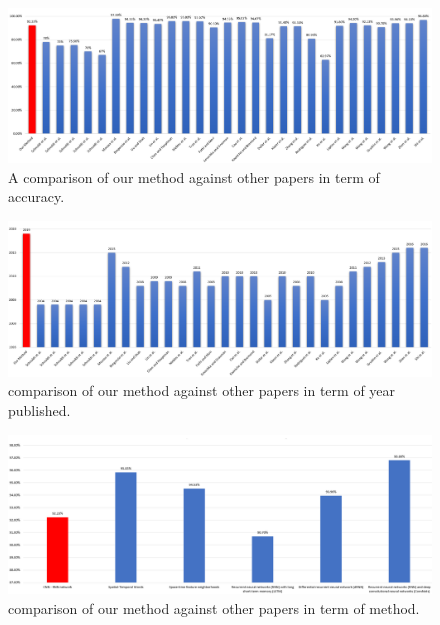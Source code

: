 \begin{figure}[ht]
\centering

\includegraphics[angle=90,origin=c,width=0.6\columnwidth]{Chapters/photos/comparisonintermofaccuracy.PNG}

\decoRule
\caption[A comparison of our method against other papers in term of accuracy.]{A comparison of our method against other papers in term of accuracy.}
\label{fig:accuracycomparison}
\end{figure}



\begin{figure}[ht]
\centering
\includegraphics[angle=90,origin=c,width=0.6\columnwidth]{Chapters/photos/comparisonintermofyear.PNG}
\decoRule
\caption[A comparison of our method against other papers in term of year published.]{ comparison of our method against other papers in term of year published.}
\label{fig:accuracycomparison1}
\end{figure}

\begin{figure}[ht]
\centering
\includegraphics[angle=90,origin=c,width=0.6\columnwidth]{Chapters/photos/comparisonintermofCNNRNN.PNG}
\decoRule
\caption[A comparison of our method against other papers in term of method.]{ comparison of our method against other papers in term of method.}
\label{fig:accuracycomparison2}
\end{figure}
